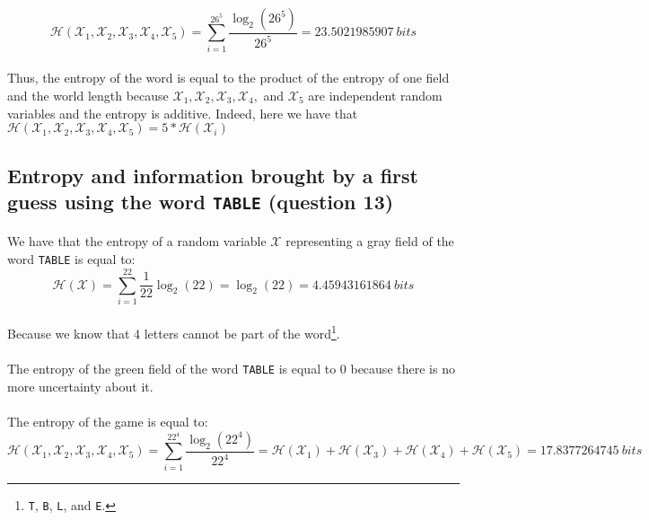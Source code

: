 \documentclass[a4paper, 11pt, oneside]{article}
\begin{document}
$$\mathcal{H}(\mathcal{X}_1, \mathcal{X}_2, \mathcal{X}_3, \mathcal{X}_4,\mathcal{X}_5) = \sum_{i = 1}^{26^5} \frac{\log_2(26^5)}{26^5} = 23.5021985907 \ bits $$

\paragraph{}Thus, the entropy of the word is equal to the product of the entropy of one field and the world length because $\mathcal{X}_1, \mathcal{X}_2, \mathcal{X}_3, \mathcal{X}_4,$ and $\mathcal{X}_5$ are independent random variables and the entropy is additive. Indeed, here we have that $\mathcal{H}(\mathcal{X}_1, \mathcal{X}_2, \mathcal{X}_3, \mathcal{X}_4,\mathcal{X}_5) = 5 * \mathcal{H}(\mathcal{X}_i)$

\subsection{Entropy and information brought by a first guess using the word \texttt{TABLE} (question 13)}

\paragraph{}We have that the entropy of a random variable $\mathcal{X}$ representing a gray field of the word \texttt{TABLE} is equal to:
$$\mathcal{H}(\mathcal{X}) = \sum_{i=1}^{22} \frac{1}{22} \log_2{(22)} = \log_2{(22)} = 4.45943161864 \ bits $$
\paragraph{}Because we know that 4 letters cannot be part of the word\footnote{\texttt{T}, \texttt{B}, \texttt{L}, and \texttt{E}.}.

\paragraph{}The entropy of the green field of the word \texttt{TABLE} is equal to 0 because there is no more uncertainty about it.

\paragraph{}The entropy of the game is equal to:
$$\mathcal{H}(\mathcal{X}_1, \mathcal{X}_2, \mathcal{X}_3, \mathcal{X}_4,\mathcal{X}_5) = \sum_{i = 1}^{22^4} \frac{\log_2(22^4)}{22^4} = \mathcal{H}(\mathcal{X}_1) + \mathcal{H}(\mathcal{X}_3) + \mathcal{H}(\mathcal{X}_4) + \mathcal{H}(\mathcal{X}_5) = 17.8377264745 \ bits$$
\end{document}
